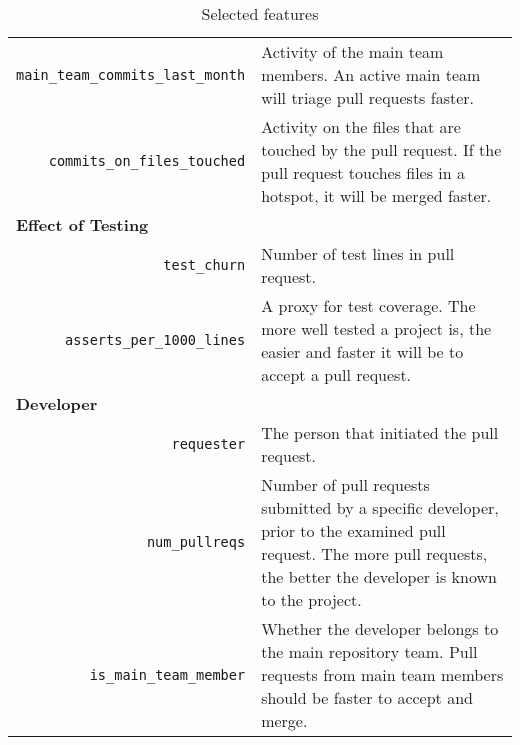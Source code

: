 \documentclass{sig-alternate}
\begin{document}
\begin{table*}
\begin{small}
\begin{tabular}{rp{25em}}
    \texttt{main\_team\_commits\_last\_month} & Activity of the main team
    members. An active main team will triage pull requests faster.\\

    \texttt{commits\_on\_files\_touched} & Activity on the files that are
    touched by the pull request. If the pull request touches files in a hotspot,
    it will be merged faster.\\
    
    \multicolumn{2}{l}{\bf{Effect of Testing}}\\

    \texttt{test\_churn} & Number of test lines in pull request. \\

    \texttt{asserts\_per\_1000\_lines} & A proxy for test coverage. The
    more well tested a project is, the easier and faster it will be to accept 
    a pull request.\\
    
    \multicolumn{2}{l}{\bf{Developer}}\\
    
    \texttt{requester} & The person that initiated the pull request.\\

    \texttt{num\_pullreqs} & Number of pull requests submitted by a specific
    developer, prior to the examined pull request. The more pull requests, the
    better the developer is known to the project.\\

    \texttt{is\_main\_team\_member} & Whether the developer belongs to the
    main repository team. Pull requests from main team members should be
    faster to accept and merge.\\
    \hline
  \end{tabular}
  \caption{Selected features}
  \label{tab:features}
  \end{small}
\end{table*}
\end{document}
